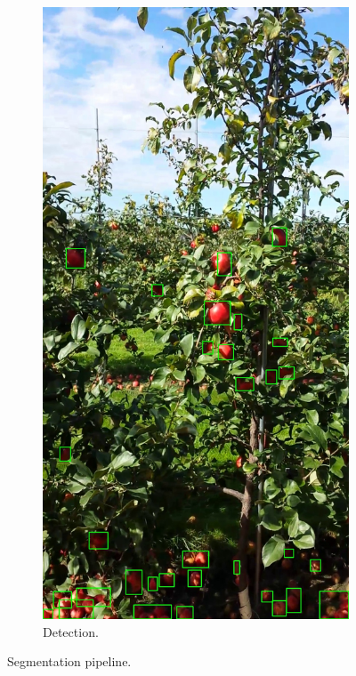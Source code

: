 \begin{figure}[!hbpt]
\begin{subfigure}[b]{.23 \textwidth}
            \includegraphics[width=\textwidth]{figures/detection/pipeline4.jpg}                  
        \caption{Detection.}       
        \label{fig:pipe5}        
        \end{subfigure}
   \caption{Segmentation pipeline.}
   \label{fig:seg_pipeline}
\end{figure}

